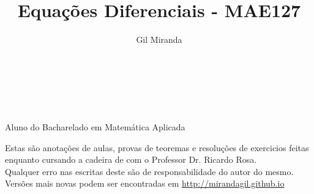\documentclass[a4paper,11pt]{article}
\author{Gil Miranda}
\title{Equações Diferenciais - MAE127}
\begin{document}
    \begin{figure}
      \centering
      \fboxsep=5mm
    \end{figure}
    \makeatletter
        \begin{center}
          \vspace*{10mm}
          \begin{Huge}\@title\end{Huge}\\
          \vspace*{50mm}
          \begin{Large}\@author\end{Large}\\
          \begin{tiny}
            Aluno do Bacharelado em Matemática Aplicada
          \end{tiny}
        \end{center}
    \makeatother
\vspace*{\fill}
    \begin{flushleft}
      Estas são anotações de aulas, provas de teoremas e resoluções de exercicios feitas enquanto cursando a cadeira de \makeatletter \@title \makeatother com o Professor Dr. Ricardo Rosa.\\
      Qualquer erro nas escritas deste são de responsabilidade do autor do mesmo.\\
      Versões mais novas podem ser encontradas em \url{http://mirandagil.github.io}
    \end{flushleft}
\newpage
\tableofcontents

\newpage
\end{document}
